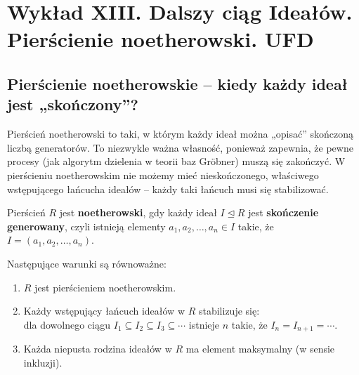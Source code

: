 \chapter{Wykład XIII. Dalszy ciąg Ideałów. Pierścienie noetherowski. UFD}

\section{Pierścienie noetherowskie – kiedy każdy ideał jest „skończony”?}

\begin{intuition}
Pierścień noetherowski to taki, w którym każdy ideał można „opisać” skończoną liczbą generatorów. To niezwykle ważna własność, ponieważ zapewnia, że pewne procesy (jak algorytm dzielenia w teorii baz Gröbner) muszą się zakończyć. W pierścieniu noetherowskim nie możemy mieć nieskończonego, właściwego wstępującego łańcucha ideałów – każdy taki łańcuch musi się stabilizować.
\end{intuition}

\begin{definition}
Pierścień $R$ jest \textbf{noetherowski}, gdy każdy ideał $I \trianglelefteq R$ jest \textbf{skończenie generowany}, czyli istnieją elementy $a_1, a_2, \dots, a_n \in I$ takie, że $I = (a_1, a_2, \dots, a_n)$.
\end{definition}

\begin{theorem}
Następujące warunki są równoważne:
\begin{enumerate}[label=\arabic*)]
    \item $R$ jest pierścieniem noetherowskim.
    \item Każdy wstępujący łańcuch ideałów w $R$ stabilizuje się:\\ dla dowolnego ciągu $I_1 \subseteq I_2 \subseteq I_3 \subseteq \cdots$ istnieje $n$ takie, że $I_n = I_{n+1} = \cdots$.
    \item Każda niepusta rodzina ideałów w $R$ ma element maksymalny (w sensie inkluzji).
\end{enumerate}
\end{theorem}

